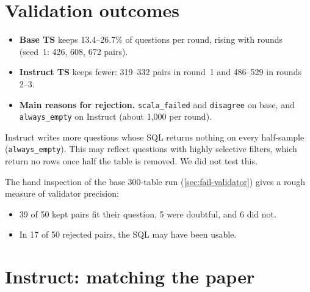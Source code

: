\section{Validation outcomes}\label{sec:sql-validation}



\begin{observation}
\begin{itemize}
\item \textbf{Base TS} keeps 13.4--26.7\% of questions per round, rising with rounds (seed~1: 426, 608, 672 pairs).
\item \textbf{Instruct TS} keeps fewer: 319--332 pairs in round~1 and 486--529 in rounds 2--3.
\item \textbf{Main reasons for rejection.} \texttt{scala\_failed} and \texttt{disagree} on base, and
\texttt{always\_empty} on Instruct (about 1,000 per round).
\end{itemize}
\end{observation}

\begin{hypothesis}
Instruct writes more questions whose SQL returns nothing on every half-sample (\texttt{always\_empty}). This may
reflect questions with highly selective filters, which return no rows once half the table is removed. We did not test
this.
\end{hypothesis}

The hand inspection of the base 300-table run (\cref{sec:fail-validator}) gives a rough measure of validator precision:
\begin{itemize}
\item 39 of 50 kept pairs fit their question, 5 were doubtful, and 6 did not.
\item In 17 of 50 rejected pairs, the SQL may have been usable.
\end{itemize}

\section{Instruct: matching the paper}\label{sec:sql-instruct}



